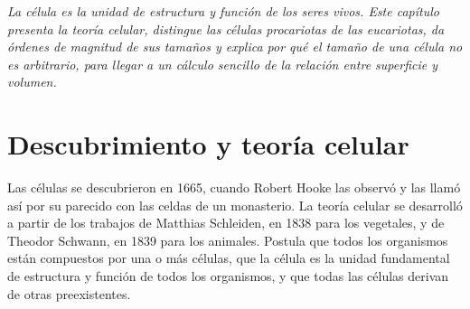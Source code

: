 \documentclass{book}
\begin{document}
\noindent\textit{La célula es la unidad de estructura y función de los seres vivos. Este capítulo presenta la teoría celular, distingue las células procariotas de las eucariotas, da órdenes de magnitud de sus tamaños y explica por qué el tamaño de una célula no es arbitrario, para llegar a un cálculo sencillo de la relación entre superficie y volumen.}


\section{Descubrimiento y teoría celular}

Las células se descubrieron en 1665, cuando Robert Hooke las observó y las llamó así por su parecido con las celdas de un monasterio. La teoría celular se desarrolló a partir de los trabajos de Matthias Schleiden, en 1838 para los vegetales, y de Theodor Schwann, en 1839 para los animales. Postula que todos los organismos están compuestos por una o más células, que la célula es la unidad fundamental de estructura y función de todos los organismos, y que todas las células derivan de otras preexistentes.

\end{document}
